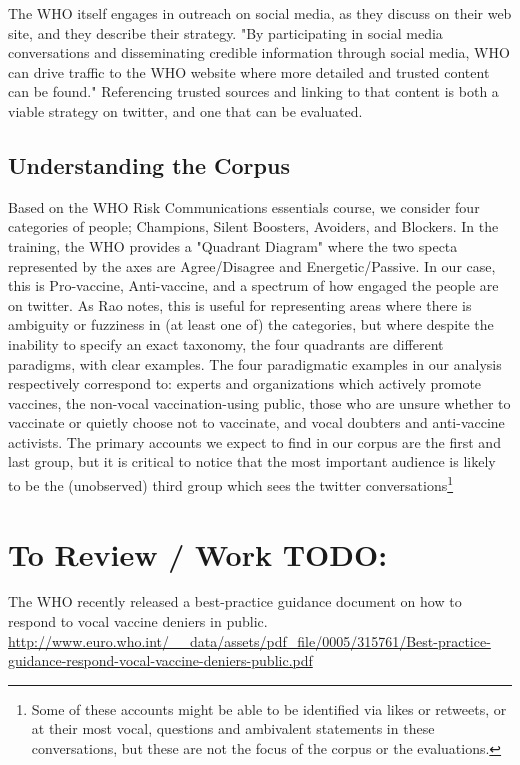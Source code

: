 \documentclass{article}
\begin{document}
The WHO itself engages in outreach on social media, as they discuss on their web site\cite{WHOWebSocialMedia}, and they describe their strategy. "By participating in social media conversations and disseminating credible information through social media, WHO can drive traffic to the WHO website where more detailed and trusted content can be found." Referencing trusted sources and linking to that content is both a viable strategy on twitter, and one that can be evaluated.
\subsection{Understanding the Corpus}

Based on the WHO Risk Communications essentials course, we consider four categories of people; Champions, Silent Boosters, Avoiders, and Blockers. In the training, the WHO provides a "Quadrant Diagram" \cite{Rao2009b} where the two specta represented by the axes are Agree/Disagree and Energetic/Passive. In our case, this is Pro-vaccine, Anti-vaccine, and a spectrum of how engaged the people are on twitter. As Rao notes, this is useful for representing areas where there is ambiguity or fuzziness in (at least one of) the categories, but where despite the inability to specify an exact taxonomy, the four quadrants are different paradigms, with clear examples. The four paradigmatic examples in our analysis respectively correspond to: experts and organizations which actively promote vaccines, the non-vocal vaccination-using public, those who are unsure whether to vaccinate or quietly choose not to vaccinate, and vocal doubters and anti-vaccine activists. The primary accounts we expect to find in our corpus are the first and last group, but it is critical to notice that the most important audience is likely to be the (unobserved) third group which sees the twitter conversations\footnote{Some of these accounts might be able to be identified via likes or retweets, or at their most vocal, questions and ambivalent statements in these conversations, but these are not the focus of the corpus or the evaluations.}


\section*{To Review / Work TODO:}

The WHO recently released a best-practice guidance document on how to respond to vocal vaccine deniers in public. \url{http://www.euro.who.int/__data/assets/pdf_file/0005/315761/Best-practice-guidance-respond-vocal-vaccine-deniers-public.pdf}
\end{document}
